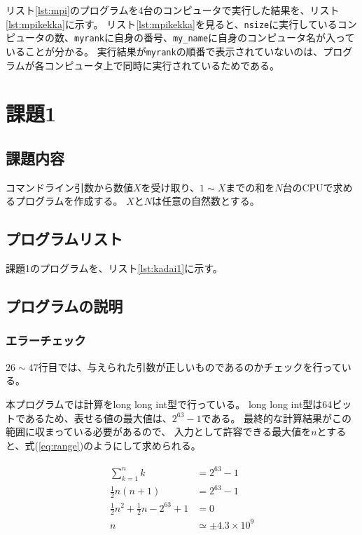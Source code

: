 \documentclass[a4j,titlepage]{jsarticle}
\begin{document}


リスト\ref{lst:mpi}のプログラムを4台のコンピュータで実行した結果を、リスト\ref{lst:mpikekka}に示す。
リスト\ref{lst:mpikekka}を見ると、\texttt{nsize}に実行しているコンピュータの数、\texttt{myrank}に自身の番号、\texttt{my\_name}に自身のコンピュータ名が入っていることが分かる。
実行結果が\texttt{myrank}の順番で表示されていないのは、プログラムが各コンピュータ上で同時に実行されているためである。




\section{課題1}
\subsection{課題内容}
コマンドライン引数から数値$X$を受け取り、$1 \sim X$までの和を$N$台のCPUで求めるプログラムを作成する。
$X$と$N$は任意の自然数とする。

\subsection{プログラムリスト}
課題1のプログラムを、リスト\ref{lst:kadai1}に示す。



\subsection{プログラムの説明}
\subsubsection{エラーチェック}
$26 \sim 47$行目では、与えられた引数が正しいものであるのかチェックを行っている。

本プログラムでは計算をlong long int型で行っている。
long long int型は64ビットであるため、表せる値の最大値は、$2^{63} - 1$である。
最終的な計算結果がこの範囲に収まっている必要があるので、
入力として許容できる最大値を$n$とすると、式(\ref{eq:range})のようにして求められる。

\begin{align}
  \begin{aligned}
    \sum^{n}_{k = 1} k &= 2^{63} - 1 \\
    \frac{1}{2} n (n + 1) &= 2^{63} - 1 \\
    \frac{1}{2} n^2 + \frac{1}{2} n - 2^{63} + 1 &= 0 \\
    n &\simeq \pm 4.3 \times 10^9
    \label{eq:range}
  \end{aligned}
\end{align}
\end{document}

